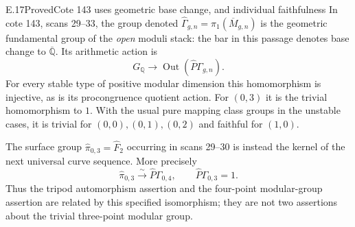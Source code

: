 \begin{result}{E.17}{Proved}{Cote 143 uses geometric base change, and individual faithfulness}
\label{sec:E-manuscript}
In cote 143, scans 29--33, the group denoted
$\widehat\Gamma_{g,n}=\pi_1(\overline M_{g,n})$ is the
geometric fundamental group of the \emph{open} moduli stack:
the bar in this passage denotes base change to
$\overline{\mathbb Q}$.  Its arithmetic action is
\[
 G_{\mathbb Q}\longrightarrow
             \operatorname{Out}(\widehat P\Gamma_{g,n}).        \tag{E.30}
\]
For every stable type of positive modular dimension this
homomorphism is injective, as is its procongruence quotient
action.  For $(0,3)$ it is the trivial homomorphism to $1$.
With the usual pure mapping class groups in the unstable
cases, it is trivial for $(0,0),(0,1),(0,2)$ and faithful
for $(1,0)$.

The surface group $\widehat\pi_{0,3}=\widehat F_2$ occurring
in scans 29--30 is instead the kernel of the next universal
curve sequence.  More precisely
\[
 \widehat\pi_{0,3}\xrightarrow{\sim}
 \widehat P\Gamma_{0,4},\qquad
 \widehat P\Gamma_{0,3}=1.                                    \tag{E.31}
\]
Thus the tripod automorphism assertion and the four-point
modular-group assertion are related by this specified
isomorphism; they are not two assertions about the trivial
three-point modular group.
\end{result}
